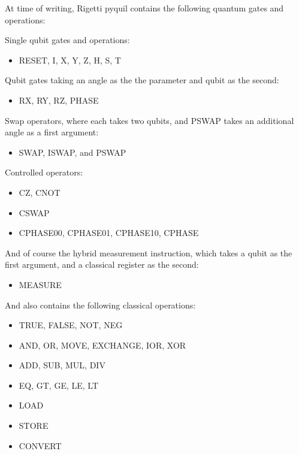 \documentclass[journal]{article}
\begin{document}
At time of writing, Rigetti pyquil contains the following quantum gates and operations:

Single qubit gates and operations:

\begin{itemize}
    \item RESET, I, X, Y, Z, H, S, T
\end{itemize}

Qubit gates taking an angle as the the parameter and qubit as the second:

\begin{itemize}
    \item RX, RY, RZ, PHASE
\end{itemize}

Swap operators, where each takes two qubits, and PSWAP takes an additional angle as a first argument:

\begin{itemize}
    \item SWAP, ISWAP, and PSWAP
\end{itemize}

Controlled operators:

\begin{itemize}
    \item CZ, CNOT %
    \item CSWAP %
    \item CPHASE00, CPHASE01, CPHASE10, CPHASE %
\end{itemize}

And of course the hybrid measurement instruction, which takes a qubit as the first argument, and a classical register as the second:

\begin{itemize}
    \item MEASURE
\end{itemize}

And also contains the following classical operations:

\begin{itemize}
    \item TRUE, FALSE, NOT, NEG %
    \item AND, OR, MOVE, EXCHANGE, IOR, XOR %
    \item ADD, SUB, MUL, DIV %
    \item EQ, GT, GE, LE, LT %
    \item LOAD %
    \item STORE %
    \item CONVERT %
\end{itemize}
\end{document}
